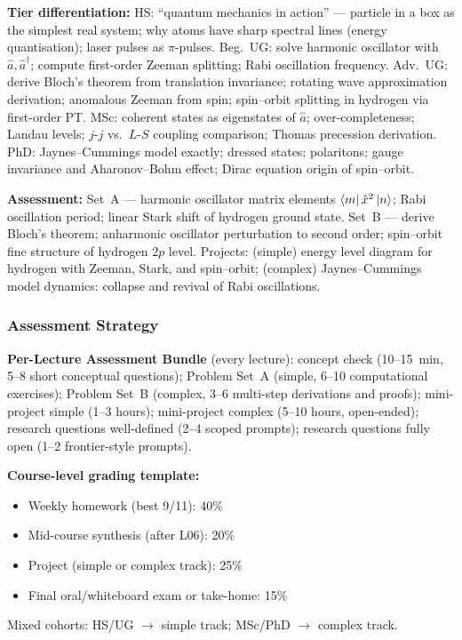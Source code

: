 \documentclass[11pt,a4paper]{article}
\begin{document}
\begin{tcolorbox}[modulebox, title={Module~I.3 --- Lecture L11: Example Systems and Physical Effects}]
\medskip\textbf{Tier differentiation:}
HS: ``quantum mechanics in action'' --- particle in a box as the simplest real system;
why atoms have sharp spectral lines (energy quantisation); laser pulses as $\pi$-pulses.
Beg.\ UG: solve harmonic oscillator with $\hat{a},\hat{a}^\dagger$; compute
first-order Zeeman splitting; Rabi oscillation frequency.
Adv.\ UG: derive Bloch's theorem from translation invariance;
rotating wave approximation derivation; anomalous Zeeman from spin;
spin--orbit splitting in hydrogen via first-order PT.
MSc: coherent states as eigenstates of $\hat{a}$; over-completeness; Landau levels;
$j$-$j$ vs.\ $L$-$S$ coupling comparison; Thomas precession derivation.
PhD: Jaynes--Cummings model exactly; dressed states; polaritons;
gauge invariance and Aharonov--Bohm effect; Dirac equation origin of spin--orbit.

\medskip\textbf{Assessment:}
Set~A --- harmonic oscillator matrix elements $\bra{m}\hat{x}^2\ket{n}$;
Rabi oscillation period; linear Stark shift of hydrogen ground state.
Set~B --- derive Bloch's theorem; anharmonic oscillator perturbation to second order;
spin--orbit fine structure of hydrogen $2p$ level.
Projects: (simple) energy level diagram for hydrogen with Zeeman, Stark, and spin--orbit;
(complex) Jaynes--Cummings model dynamics: collapse and revival of Rabi oscillations.
\end{tcolorbox}

\subsubsection*{Assessment Strategy}

\begin{tcolorbox}[highlightbox]
\textbf{Per-Lecture Assessment Bundle} (every lecture):
concept check (10--15~min, 5--8 short conceptual questions);
Problem Set~A (simple, 6--10 computational exercises);
Problem Set~B (complex, 3--6 multi-step derivations and proofs);
mini-project simple (1--3 hours);
mini-project complex (5--10 hours, open-ended);
research questions well-defined (2--4 scoped prompts);
research questions fully open (1--2 frontier-style prompts).
\end{tcolorbox}

\medskip
\noindent\textbf{Course-level grading template:}
\begin{itemize}[leftmargin=1.5em]
  \item Weekly homework (best 9/11): 40\%
  \item Mid-course synthesis (after L06): 20\%
  \item Project (simple or complex track): 25\%
  \item Final oral/whiteboard exam or take-home: 15\%
\end{itemize}
Mixed cohorts: HS/UG $\to$ simple track; MSc/PhD $\to$ complex track.
\end{document}
